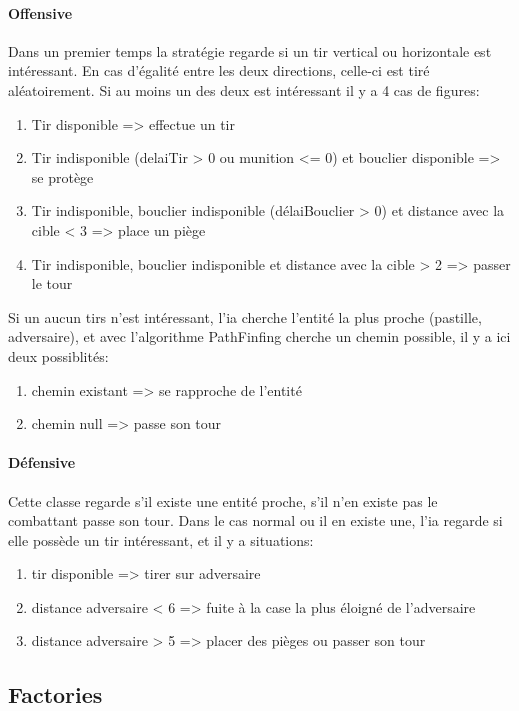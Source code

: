 \documentclass[a4paper,12pt]{article}
\begin{document}
	\paragraph{Offensive}
	\label{sec:Offensive}
	Dans un premier temps la stratégie regarde si un tir vertical ou horizontale est intéressant.
	En cas d’égalité entre les deux directions, celle-ci est tiré aléatoirement. Si au moins un des deux est intéressant il y a 4 cas de figures:
	\begin{enumerate}
		\item Tir disponible => effectue un tir
		\item Tir indisponible (delaiTir > 0 ou munition <= 0) et bouclier disponible => se protège
		\item Tir indisponible, bouclier indisponible (délaiBouclier > 0) et distance avec la cible < 3 => place un piège
		\item Tir indisponible, bouclier indisponible et distance avec la cible > 2 => passer le tour
	\end{enumerate}
	Si un aucun tirs n'est intéressant, l'ia cherche l'entité la plus proche (pastille, adversaire), et avec l'algorithme PathFinfing cherche un chemin possible, il y a ici deux possiblités:
	\begin{enumerate}
		\item chemin existant => se rapproche de l'entité
		\item chemin null => passe son tour
	\end{enumerate}
	
	\paragraph{Défensive}
	\label{sec:Défensive}
	Cette classe regarde s'il existe une entité proche, s'il n'en existe pas le combattant passe son tour. Dans le cas normal ou il en existe une, l'ia regarde si elle possède un tir intéressant, et il y a  situations:
	\begin{enumerate}
		\item tir disponible => tirer sur adversaire
		\item distance adversaire < 6 => fuite à la case la plus éloigné de l'adversaire
		\item distance adversaire > 5 => placer des pièges ou passer son tour 
	\end{enumerate}
	
	\subsection{Factories}
\end{document}
